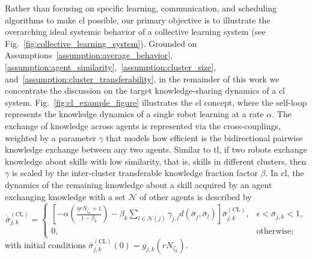 \documentclass[12pt]{article}
\begin{document}
Rather than focusing on specific learning, communication, and scheduling algorithms to make \ac{cl} possible, our primary objective is to illustrate the overarching ideal systemic behavior of a collective learning system (see Fig.~\ref{fig:collective_learning_system}). Grounded on Assumptions~\ref{assumption:average_behavior}, \ref{assumption:agent_similarity},~\ref{assumption:cluster_size}, and~\ref{assumption:cluster_transferability}, in the remainder of this work we concentrate the discussion on the target knowledge-sharing dynamics of a \ac{cl} system. Fig.~\ref{fig:cl_example_figure} illustrates the \ac{cl} concept, where the self-loop represents the knowledge dynamics of a single robot learning at a rate $\alpha$. The exchange of knowledge across agents 
is represented via the cross-couplings, weighted by a parameter $\gamma$ that models how efficient is the bidirectional pairwise knowledge exchange between any two agents. Similar to \ac{tl}, if two robots exchange knowledge about skills with low similarity, that is, skills in different clusters, then $\gamma$ is scaled by the inter-cluster transferable knowledge fraction factor $\beta$. In \ac{cl}, the dynamics of the remaining knowledge  about a skill acquired by an agent exchanging knowledge with a set $\mathcal{N}$ of other agents is described by
\begin{equation}\label{eq:collective_knowledge_dynamics}
	\dot{\bar{\sigma}}^{(\text{CL})}_{j,k} =
	\begin{cases}
		\left[-\alpha \left( \frac{\eta r N_{\zeta_k} + 1}{1 - \beta_k} \right)  - \beta_k \sum_{l \in \mathcal{N}(j)}\gamma_{j,l}d(\bar{\sigma}_j,\bar{\sigma}_l)\right] \bar{\sigma}^{(\text{CL})}_{j,k}, & \epsilon < \bar{\sigma}_{j,k} < 1, \\
		0, & \text{otherwise};
	\end{cases}
\end{equation}
\noindent with initial conditions $\bar{\sigma}^{(\text{CL})}_{j,k}(0) = g_{j,k}\left(r N_{\zeta_k}\right)$.
\end{document}

